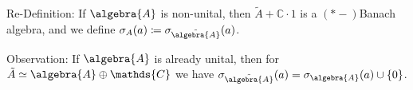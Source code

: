 \documentclass[a4paper]{article}
\begin{document}


		

\begin{definition}
	Re-Definition: If $\algebra{A}$ is non-unital, then $\tilde{A} + \mathds{C} \cdot 1$ is a $(*-)$Banach algebra, and we define $\sigma_A(a) \coloneq \sigma_{\tilde{\algebra{A}}}(a)$.
\end{definition}

Observation: If $\algebra{A}$ is already unital, then for $\tilde{A} \simeq \algebra{A} \oplus \mathds{C}$ we have $\sigma_{\tilde{\algebra{A}}}(a) = \sigma_\algebra{A}(a) \cup \{ 0\}$.
\end{document}
